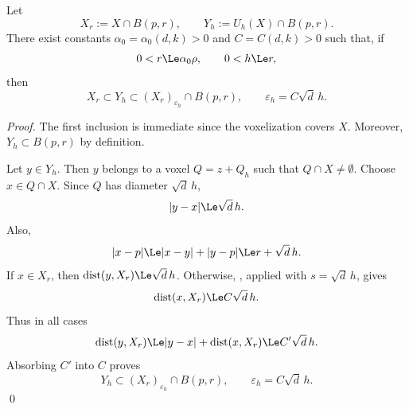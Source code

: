 \begin{theorem}
\label{thm:cubical-admissible-set}
Let
\[
 X_r:=X\cap B(p,r),\qquad
 Y_h:=U_h(X)\cap B(p,r).
\]
There exist constants $\alpha_0=\alpha_0(d,k)>0$ and $C=C(d,k)>0$
such that, if
\[
 0<r\Le\alpha_0\rho,
 \qquad
 0<h\Le r,
\]
then
\begin{equation}
\label{eq:cubical-admissible}
 \boxed{
 X_r\subset Y_h
 \subset (X_r)_{\varepsilon_h}\cap B(p,r),
 \qquad
 \varepsilon_h=C\sqrt d\,h.}
\end{equation}
\end{theorem}
\begin{proof}
The first inclusion is immediate since the voxelization covers $X$.
Moreover, $Y_h\subset B(p,r)$ by definition.

Let $y\in Y_h$. Then $y$ belongs to a voxel $Q=z+Q_h$ such that
$Q\cap X\ne\emptyset$. Choose $x\in Q\cap X$. Since $Q$ has diameter
$\sqrt d\,h$,
\begin{equation}
\label{eq:y-x-cube}
 |y-x|\Le\sqrt d\,h.
\end{equation}
Also,
\[
 |x-p|\Le |x-y|+|y-p|\Le r+\sqrt d\,h.
\]
If $x\in X_r$, then
$\operatorname{dist}(y,X_r)\Le\sqrt d\,h$. Otherwise,
, applied with $s=\sqrt d\,h$, gives
\[
 \operatorname{dist}(x,X_r)\Le C\sqrt d\,h.
\]
Thus in all cases
\[
 \operatorname{dist}(y,X_r)
 \Le |y-x|+\operatorname{dist}(x,X_r)
 \Le C'\sqrt d\,h.
\]
Absorbing $C'$ into $C$ proves
\[
 Y_h\subset(X_r)_{\varepsilon_h}\cap B(p,r),
 \qquad
 \varepsilon_h=C\sqrt d\,h.
\]
\qed
\end{proof}
